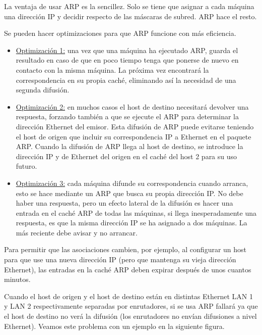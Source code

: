 \documentclass[10pt,a4paper]{report}
\begin{document}
	\par La ventaja de usar ARP es la sencillez. Solo se tiene que asignar a cada máquina una dirección IP y decidir respecto de las máscaras de subred. ARP hace el resto.
	
	\par Se pueden hacer optimizaciones para que ARP funcione con más eficiencia.
	
		\begin{itemize}
			\item \underline{Optimización 1:} una vez que una máquina ha ejecutado ARP, guarda el resultado en caso de que en poco tiempo tenga que ponerse de nuevo en contacto con la misma máquina. La próxima vez encontrará la correspondencia en su propia caché, eliminando así la necesidad de una segunda difusión.

			\item \underline{Optimización 2:} en muchos casos el host de destino necesitará devolver una respuesta, forzando también a que se ejecute el ARP para determinar la dirección Ethernet del emisor. Esta difusión de ARP puede evitarse teniendo el host de origen que incluir su correspondencia IP a Ethernet en el paquete ARP. Cuando la difusión de ARP llega al host de destino, se introduce la dirección IP y de Ethernet del origen en el caché del host 2 para su uso futuro.
			
			\item \underline{Optimización 3:} cada máquina difunde su correspondencia cuando arranca, esto se hace mediante un ARP que busca su propia dirección IP. No debe haber una respuesta, pero un efecto lateral de la difusión es hacer una entrada en el caché ARP de todas las máquinas, si llega inesperadamente una respuesta, es que la misma dirección IP se ha asignado a dos máquinas. La más reciente debe avisar y no arrancar.
		\end{itemize}

	\par Para permitir que las asociaciones cambien, por ejemplo, al configurar un host para que use una nueva dirección IP (pero que mantenga su vieja dirección Ethernet), las entradas en la caché ARP deben expirar después de unos cuantos minutos.
	
	\par Cuando el host de origen y el host de destino están en distintas Ethernet LAN 1 y LAN 2 respectivamente separadas por enrutadores, si se usa ARP fallará ya que el host de destino no verá la difusión (los enrutadores no envían difusiones a nivel Ethernet). Veamos este problema con un ejemplo en la siguiente figura.
	
\end{document}
